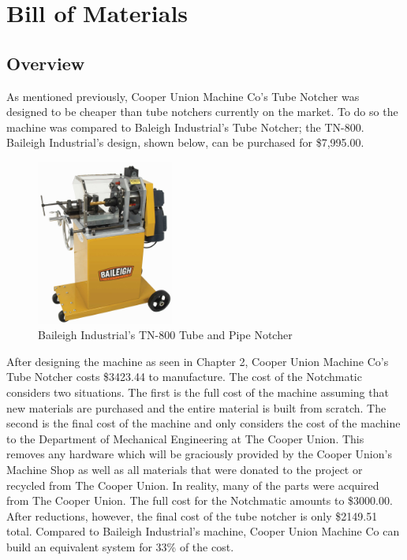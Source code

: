 \chapter{Bill of Materials}

\section{Overview}

As mentioned previously, Cooper Union Machine Co's Tube Notcher was designed to be cheaper than tube notchers currently on the market. To do so the machine was compared to Baleigh Industrial's Tube Notcher; the TN-800. Baileigh Industrial's design, shown below, can be purchased for \$7,995.00.

\begin{figure}[hbp]
    \centering
    \includegraphics[width=0.4\textwidth]{./fall-report pictures/Chapter4-BillofMaterials/TN-800}
    \caption{Baileigh Industrial's TN-800 Tube and Pipe Notcher}
    \label{fig:Baileigh Industrial}
\end{figure}

After designing the machine as seen in Chapter 2, Cooper Union Machine Co's Tube Notcher costs \$3423.44 to manufacture. The cost of the Notchmatic considers two situations. The first is the full cost of the machine assuming that new materials are purchased and the entire material is built from scratch. The second is the final cost of the machine and only considers the cost of the machine to the Department of Mechanical Engineering at The Cooper Union. This removes any hardware which will be graciously provided by the Cooper Union's Machine Shop as well as all materials that were donated to the project or recycled from The Cooper Union. In reality, many of the parts were acquired from The Cooper Union. The full cost for the Notchmatic amounts to \$3000.00. After reductions, however, the final cost of the tube notcher is only \$2149.51 total. Compared to Baileigh Industrial's machine, Cooper Union Machine Co can build an equivalent system for 33\% of the cost. 

